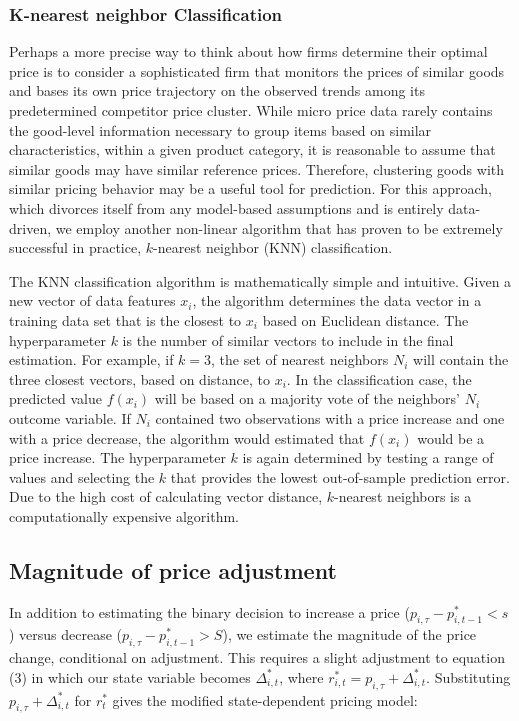\documentclass[11pt]{article}
\begin{document}
\subsubsection{K-nearest neighbor Classification}
Perhaps a more precise way to think about how firms determine their optimal price is to consider a sophisticated firm that monitors the prices of similar goods and bases its own price trajectory on the observed trends among its predetermined competitor price cluster. While micro price data rarely contains the good-level information necessary to group items based on similar characteristics, within a given product category, it is reasonable to assume that similar goods may have similar reference prices. Therefore, clustering goods with similar pricing behavior may be a useful tool for prediction. For this approach, which divorces itself from any model-based assumptions and is entirely data-driven, we employ another non-linear algorithm that has proven to be extremely successful in practice, $k$-nearest neighbor (KNN) classification.

The KNN classification algorithm is mathematically simple and intuitive. Given a new vector of data features $x_{i}$, the algorithm determines the data vector in a training data set that is the closest to $x_{i}$ based on Euclidean distance. The hyperparameter $k$ is the number of similar vectors to include in the final estimation. For example, if $k = 3$, the set of nearest neighbors $N_{i}$ will contain the three closest vectors, based on distance, to $x_{i}$. In the classification case, the predicted value $f(x_{i})$ will be based on a majority vote of the neighbors' $N_{i}$ outcome variable. If $N_{i}$ contained two observations with a price increase and one with a price decrease, the algorithm would estimated that $f(x_{i})$ would be a price increase. The hyperparameter $k$ is again determined by testing a range of values and selecting the $k$ that provides the lowest out-of-sample prediction error. Due to the high cost of calculating vector distance, $k$-nearest neighbors is a computationally expensive algorithm.    


\subsection{Magnitude of price adjustment}

In addition to estimating the binary decision to increase a price ($p_{i,\tau} - p^{*}_{i,t-1} < s$) versus decrease ($p_{i,\tau} - p^{*}_{i,t-1} > S$), we estimate the magnitude of the price change, conditional on adjustment. This requires a slight adjustment to equation (3) in which our state variable becomes $\Delta^{*}_{i,t}$, where $r^{*}_{i,t} = p_{i,\tau} +\Delta^{*}_{i,t} $. Substituting $p_{i,\tau} +\Delta^{*}_{i,t}$ for $r^{*}_t$ gives the modified state-dependent pricing model:
    
\end{document}
